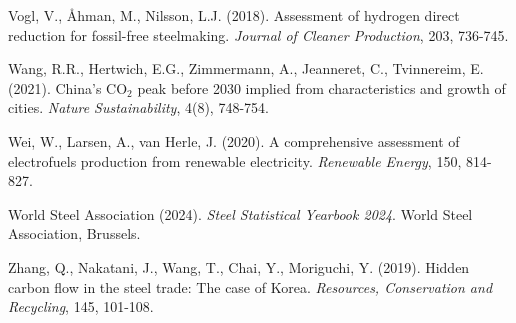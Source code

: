 \documentclass[preprint,5p,authoryear]{elsarticle}
\begin{document}
\begin{thebibliography}{99}
 Vogl, V., Åhman, M., Nilsson, L.J. (2018). Assessment of hydrogen direct reduction for fossil-free steelmaking. \textit{Journal of Cleaner Production}, 203, 736-745.

 Wang, R.R., Hertwich, E.G., Zimmermann, A., Jeanneret, C., Tvinnereim, E. (2021). China's CO$_2$ peak before 2030 implied from characteristics and growth of cities. \textit{Nature Sustainability}, 4(8), 748-754.

 Wei, W., Larsen, A., van Herle, J. (2020). A comprehensive assessment of electrofuels production from renewable electricity. \textit{Renewable Energy}, 150, 814-827.

 World Steel Association (2024). \textit{Steel Statistical Yearbook 2024}. World Steel Association, Brussels.

 Zhang, Q., Nakatani, J., Wang, T., Chai, Y., Moriguchi, Y. (2019). Hidden carbon flow in the steel trade: The case of Korea. \textit{Resources, Conservation and Recycling}, 145, 101-108.

\end{thebibliography}
\end{document}
